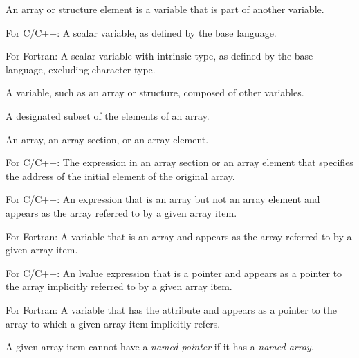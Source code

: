 \begin{adjustwidth}{-0.75in}{0in}
\begin{note}
An array or structure element is a variable that is part of another variable.
\end{note}
\end{adjustwidth}
\glossarydefend

\glossarydefstart
For C/C++:
\nopagebreak
A scalar variable, as defined by the base language.

For Fortran:
\nopagebreak
A scalar variable with intrinsic type, as defined by the base language,
excluding character type.
\glossarydefend

\glossarydefstart
A variable, such as an array or structure, composed of other variables.
\glossarydefend

\glossarydefstart
A designated subset of the elements of an array.
\glossarydefend

\glossarydefstart
An array, an array section, or an array element.
\glossarydefend

\glossarydefstart
For C/C++: The expression in an array section or an array element that specifies
the address of the initial element of the original array.
\glossarydefend

\glossarydefstart
For C/C++:
\nopagebreak
An expression that is an array but not an array element and appears as the
array referred to by a given array item.

For Fortran:
\nopagebreak
A variable that is an array and appears as the array referred to by a given
array item.
\glossarydefend

\glossarydefstart
For C/C++:
\nopagebreak
An lvalue expression that is a pointer and appears as a pointer to the array
implicitly referred to by a given array item.

For Fortran:
\nopagebreak
A variable that has the  attribute and appears as a pointer to
the array to which a given array item implicitly refers.

\begin{adjustwidth}{-0.75in}{0in}
\begin{note}
A given array item cannot have a \emph{named pointer} if it has a \emph{named array}.
\end{note}
\end{adjustwidth}
\glossarydefend


